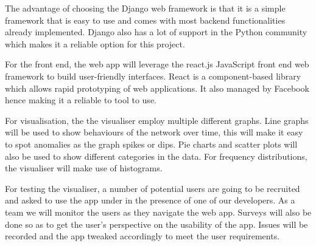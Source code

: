 The advantage of choosing the Django web framework is that it is a simple framework that is easy to use and comes with most backend functionalities already implemented. Django also has a lot of support in the Python community which makes it a reliable option for this project.

For the front end, the web app will leverage the react.js JavaScript front end web framework to build user-friendly interfaces. React is a component-based library which allows rapid prototyping of web applications. It also managed by Facebook hence making it a reliable to tool to use.

For visualisation, the the visualiser employ multiple different graphs. Line graphs will be used to show behaviours of the network over time, this will make it easy to spot anomalies as the graph spikes or dips. Pie charts and scatter plots will also be used to show different categories in the data. For frequency distributions, the visualiser will make use of histograms.

For testing the visualiser, a number of potential users are going to be recruited and asked to use the app under in the presence of one of our developers. As a team we will monitor the users as they navigate the web app. Surveys will also be done so as to get the user’s perspective on the usability of the app. Issues will be recorded and the app tweaked accordingly to meet the user requirements.
